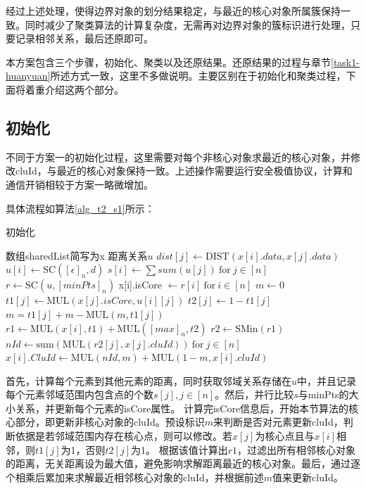 经过上述处理，使得边界对象的划分结果稳定，与最近的核心对象所属簇保持一致。同时减少了聚类算法的计算复杂度，无需再对边界对象的簇标识进行处理，只要记录相邻关系，最后还原即可。

本方案包含三个步骤，初始化、聚类以及还原结果。还原结果的过程与章节\ref{task1-huanyuan}所述方式一致，这里不多做说明。主要区别在于初始化和聚类过程，下面将着重介绍这两个部分。

\subsection{初始化}
不同于方案一的初始化过程，这里需要对每个非核心对象求最近的核心对象，并修改cluId，与最近的核心对象保持一致。上述操作需要运行安全极值协议，计算和通信开销相较于方案一略微增加。

具体流程如算法\ref{alg_t2_s1}所示：
\begin{algorithm}[htbp]
	\renewcommand{\algorithmicrequire}{\textbf{输入:}}
	\renewcommand{\algorithmicensure}{\textbf{输出:}}
	\caption{初始化}
	\label{alg_t2_s1}
	\begin{algorithmic}[1]
		\REQUIRE 数组sharedList简写为x
		\ENSURE 距离关系$ u $
		\STATE $ dist[j] \leftarrow \text{DIST}(x[i].data, x[j].data) $
		\ENDFOR
		\STATE $ u[i] \leftarrow \text{SC}([\epsilon]_n, d) $
		\STATE $ s[i] \leftarrow \sum{sum}(u[j])\ \text{for}\ j\in[n]$
		\ENDFOR
		\STATE $ r \leftarrow \text{SC}(u, [minPts]_n) $
		\STATE x[i].isCore $\leftarrow r[i]\ \text{for}\ i\in[n] $
		\STATE $ m \leftarrow 0 $
		\STATE $ t1[j] \leftarrow \text{MUL}(x[j].isCore, u[i][j]) $
		\STATE $ t2[j] \leftarrow 1-t1[j] $
		\STATE $ m = t1[j] + m - \text{MUL}(m, t1[j]) $
		\ENDFOR
		\STATE $ r1 \leftarrow \text{MUL}(x[i], t1) + \text{MUL}([max]_n, t2) $
		\STATE $ r2 \leftarrow \text{SMin}(r1) $
		\STATE $ nId \leftarrow \text{sum}(\text{MUL}(r2[j], x[j].cluId))\ \text{for}\ j \in [n] $
		\STATE $ x[i].CluId \leftarrow \text{MUL}(nId, m) + \text{MUL}(1-m, x[i].cluId)$
		\ENDFOR
	\end{algorithmic}
\end{algorithm}

首先，计算每个元素到其他元素的距离，同时获取邻域关系存储在$ u $中，并且记录每个元素邻域范围内包含点的个数$ s[j],j\in[n] $。然后，并行比较$ s $与minPts的大小关系，并更新每个元素的isCore属性。
计算完isCore信息后，开始本节算法的核心部分，即更新非核心对象的cluId。预设标识$ m $来判断是否对元素更新cluId，判断依据是若邻域范围内存在核心点，则可以修改。若$ x[j] $为核心点且与$ x[i] $相邻，则$ t1[j] $为1，否则$ t2[j] $为1。
根据该值计算出$ r1 $，过滤出所有相邻核心对象的距离，无关距离设为最大值，避免影响求解距离最近的核心对象。最后，通过逐个相乘后累加来求解最近相邻核心对象的cluId，并根据前述$ m $值来更新cluId。

